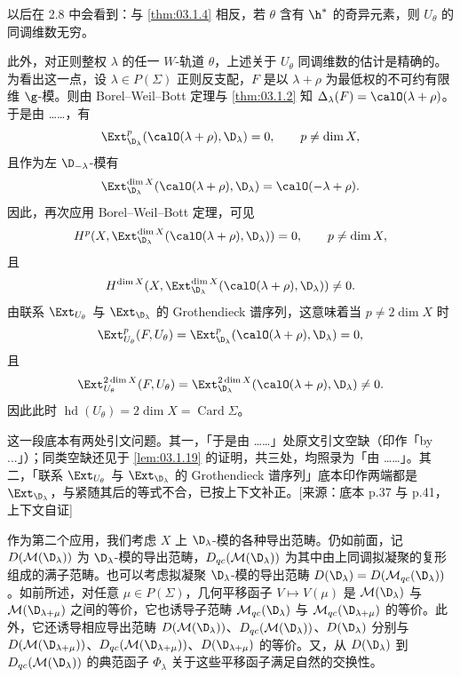 \begin{remark}\label{rem:03.1.5}
以后在 2.8 中会看到：与 \ref{thm:03.1.4} 相反，若 $\theta$ 含有 $\h^*$ 的奇异元素，则 $U_\theta$ 的同调维数无穷。

此外，对正则整权 $\lambda$ 的任一 $W$-轨道 $\theta$，上述关于 $U_\theta$ 同调维数的估计是精确的。为看出这一点，设 $\lambda\in P(\Sigma)$ 正则反支配，$F$ 是以 $\lambda+\rho$ 为最低权的不可约有限维 $\g$-模。则由 Borel--Weil--Bott 定理与 \ref{thm:03.1.2} 知 $\Delta_\lambda(F)=\calO(\lambda+\rho)$。于是由 ……，有
$$\Ext^p_{\D_\lambda}(\calO(\lambda+\rho),\D_\lambda)=0,\qquad p\ne\dim X,$$
且作为左 $\D_{-\lambda}$-模有
$$\Ext^{\dim X}_{\D_\lambda}(\calO(\lambda+\rho),\D_\lambda)=\calO(-\lambda+\rho).$$
因此，再次应用 Borel--Weil--Bott 定理，可见
$$H^p(X,\Ext^{\dim X}_{\D_\lambda}(\calO(\lambda+\rho),\D_\lambda))=0,\qquad p\ne\dim X,$$
且
$$H^{\dim X}(X,\Ext^{\dim X}_{\D_\lambda}(\calO(\lambda+\rho),\D_\lambda))\ne 0.$$
由联系 $\Ext_{U_\theta}$ 与 $\Ext_{\D_\lambda}$ 的 Grothendieck 谱序列，这意味着当 $p\ne 2\dim X$ 时
$$\Ext^p_{U_\theta}(F,U_\theta)=\Ext^p_{\D_\lambda}(\calO(\lambda+\rho),\D_\lambda)=0,$$
且
$$\Ext^{2\dim X}_{U_\theta}(F,U_\theta)=\Ext^{2\dim X}_{\D_\lambda}(\calO(\lambda+\rho),\D_\lambda)\ne 0.$$
因此此时 $\operatorname{hd}(U_\theta)=2\dim X=\operatorname{Card}\Sigma$。
\end{remark}

\begin{annote}
这一段底本有两处引文问题。其一，「于是由 ……」处原文引文空缺（印作「by ...」）；同类空缺还见于 \ref{lem:03.1.19} 的证明，共三处，均照录为「由 ……」。其二，「联系 $\Ext_{U_\theta}$ 与 $\Ext_{\D_\lambda}$ 的 Grothendieck 谱序列」底本印作两端都是 $\Ext_{\D_\lambda}$，与紧随其后的等式不合，已按上下文补正。[来源：底本 p.37 与 p.41，上下文自证]
\end{annote}

作为第二个应用，我们考虑 $X$ 上 $\D_\lambda$-模的各种导出范畴。仍如前面，记 $D(\mathcal{M}(\D_\lambda))$ 为 $\D_\lambda$-模的导出范畴，$D_{qc}(\mathcal{M}(\D_\lambda))$ 为其中由上同调拟凝聚的复形组成的满子范畴。也可以考虑拟凝聚 $\D_\lambda$-模的导出范畴 $D(\D_\lambda)=D(\mathcal{M}_{qc}(\D_\lambda))$。如前所述，对任意 $\mu\in P(\Sigma)$，几何平移函子 $V\mapsto V(\mu)$ 是 $\mathcal{M}(\D_\lambda)$ 与 $\mathcal{M}(\D_{\lambda+\mu})$ 之间的等价，它也诱导子范畴 $\mathcal{M}_{qc}(\D_\lambda)$ 与 $\mathcal{M}_{qc}(\D_{\lambda+\mu})$ 的等价。此外，它还诱导相应导出范畴 $D(\mathcal{M}(\D_\lambda))$、$D_{qc}(\mathcal{M}(\D_\lambda))$、$D(\D_\lambda)$ 分别与 $D(\mathcal{M}(\D_{\lambda+\mu}))$、$D_{qc}(\mathcal{M}(\D_{\lambda+\mu}))$、$D(\D_{\lambda+\mu})$ 的等价。又，从 $D(\D_\lambda)$ 到 $D_{qc}(\mathcal{M}(\D_\lambda))$ 的典范函子 $\Phi_\lambda$ 关于这些平移函子满足自然的交换性。

